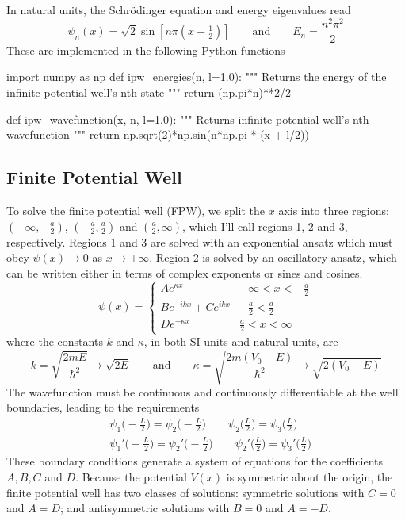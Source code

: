 \documentclass[11pt, a4paper]{article}
\newcommand{\eqtext}[1]{\qquad \text{#1} \qquad}
\newcommand{\schro}{Schr\"{o}dinger\xspace}
\begin{document}
In natural units, the \schro equation and energy eigenvalues read
\begin{equation}
	\psi_{n}(x) = \sqrt{2}\sin\left[n\pi\left(x + \tfrac{1}{2}\right)\right] \eqtext{and} E_{n} = \frac{n^{2}\pi^{2}}{2} \label{bvp:eq:ipw-sol}
\end{equation}
These are implemented in the following Python functions
\begin{python}
import numpy as np
def ipw_energies(n, l=1.0):
""" Returns the energy of the infinite potential well's nth state """
    return (np.pi*n)**2/2

def ipw_wavefunction(x, n, l=1.0):
""" Returns infinite potential well's nth wavefunction """
    return np.sqrt(2)*np.sin(n*np.pi * (x + l/2))
\end{python}


\subsection{Finite Potential Well} \label{bvp:ss:fpw}
To solve the finite potential well (FPW), we split the $ x $ axis into three regions: $ (-\infty, -\frac{a}{2})$, $ (-\frac{a}{2}, \frac{a}{2}) $ and $ (\frac{a}{2}, \infty) $, which I'll call regions 1, 2 and 3, respectively. Regions 1 and 3 are solved with an exponential ansatz which must obey $ \psi(x) \to 0 $ as $ x \to \pm \infty $. Region 2 is solved by an oscillatory ansatz, which can be written either in terms of complex exponents or sines and cosines. 
\begin{equation*}
	\psi(x) = 
	\begin{cases}
		A e^{\kappa x} & -\infty < x < -\frac{a}{2}\\
		Be^{-ikx} + Ce^{ikx} & -\frac{a}{2} < \frac{a}{2}\\
		D e^{-\kappa x} & \frac{a}{2} < x < \infty
	\end{cases}
\end{equation*}
where the constants $ k  $ and $ \kappa $, in both SI units and natural units, are
\begin{equation*}
	k = \sqrt{\frac{2mE}{\hbar^{2}}} \to \sqrt{2E} \eqtext{and} \kappa = \sqrt{\frac{2m(V_{0} - E)}{\hbar^{2}}} \to \sqrt{2(V_{0} - E)}
\end{equation*}
The wavefunction must be continuous and continuously differentiable at the well boundaries, leading to the requirements
\begin{align*}
	&\psi_{1}\big(-\tfrac{L}{2}\big) = \psi_{2}\big(-\tfrac{L}{2}\big) \qquad 	\psi_{2}\big(\tfrac{L}{2}\big) = \psi_{3}\big(\tfrac{L}{2}\big)\\
	&\psi_{1}'\big(-\tfrac{L}{2}\big) = \psi_{2}'\big(-\tfrac{L}{2}\big) \qquad 	\psi_{2}'\big(\tfrac{L}{2}\big) = \psi_{3}'\big(\tfrac{L}{2}\big)
\end{align*}
These boundary conditions generate a system of equations for the coefficients $ A, B, C $ and $ D $. Because the potential $ V(x) $ is symmetric about the origin, the finite potential well has two classes of solutions: symmetric solutions with $ C = 0 $ and $ A = D $; and antisymmetric solutions with $ B = 0 $ and $ A = -D $.
\end{document}
